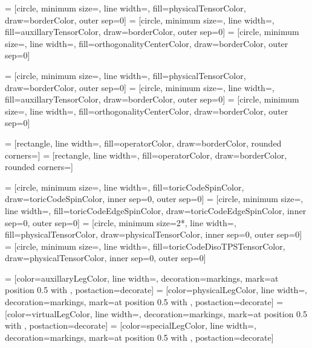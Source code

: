  = [circle, minimum size=, line width=, fill=physicalTensorColor, draw=borderColor, outer sep=0]
 = [circle, minimum size=, line width=, fill=auxillaryTensorColor, draw=borderColor, outer sep=0]
 = [circle, minimum size=, line width=, fill=orthogonalityCenterColor, draw=borderColor, outer sep=0]

 = [circle, minimum size=\smallTensorWidth, line width=, fill=physicalTensorColor, draw=borderColor, outer sep=0]
 = [circle, minimum size=\smallTensorWidth, line width=, fill=auxillaryTensorColor, draw=borderColor, outer sep=0]
 = [circle, minimum size=\smallTensorWidth, line width=, fill=orthogonalityCenterColor, draw=borderColor, outer sep=0]

 = [rectangle, line width=, fill=operatorColor, draw=borderColor, rounded corners=\roundedCornerInsetNormal]
 = [rectangle, line width=, fill=operatorColor, draw=borderColor, rounded corners=\roundedCornerInsetSmall]

 = [circle, minimum size=\tinyTensorWidth, line width=, fill=toricCodeSpinColor, draw=toricCodeSpinColor, inner sep=0, outer sep=0]
 = [circle, minimum size=\tinyTensorWidth, line width=, fill=toricCodeEdgeSpinColor, draw=toricCodeEdgeSpinColor, inner sep=0, outer sep=0]
 = [circle, minimum size=2*\tinyTensorWidth, line width=, fill=physicalTensorColor, draw=physicalTensorColor, inner sep=0, outer sep=0]
 = [circle, minimum size=, line width=, fill=toricCodeDisoTPSTensorColor, draw=physicalTensorColor, inner sep=0, outer sep=0]

 = [color=auxillaryLegColor, line width=, decoration={markings, mark=at position 0.5 with {}}, postaction={decorate}]
 = [color=physicalLegColor, line width=, decoration={markings, mark=at position 0.5 with {}}, postaction={decorate}]
 = [color=virtualLegColor, line width=, decoration={markings, mark=at position 0.5 with {}}, postaction={decorate}]
 = [color=specialLegColor, line width=, decoration={markings, mark=at position 0.5 with {}}, postaction={decorate}]

